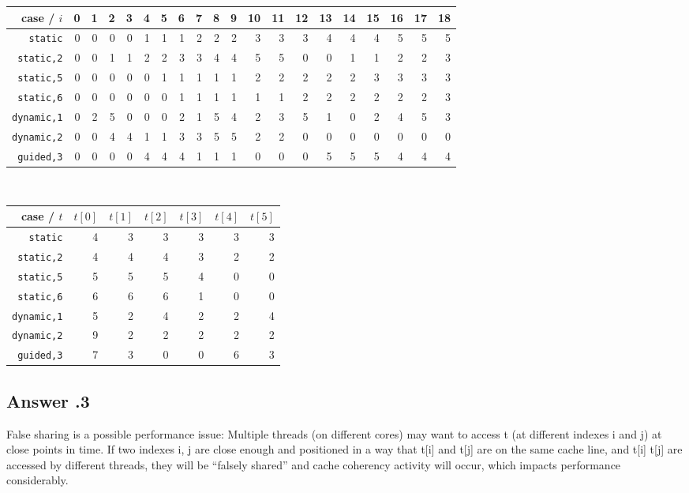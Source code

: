 \documentclass[a4paper,%
11pt,%
DIV=12,
headsepline,%
headings=normal,
]{scrartcl}
\newcounter{curex}
\newcommand{\answer}[1]{\subsection*{Answer \arabic{curex}.#1}}
\begin{document}
\begin{tabular}{rrrrrrrrrrrrrrrrrrrr}
  \toprule
 case /  $i$ & 0 & 1 & 2 & 3 & 4 & 5 & 6 & 7 & 8 & 9 & 10 & 11 & 12 & 13 & 14 & 15 & 16 & 17 & 18  \\
  \midrule
\texttt{static}     & 0 & 0 & 0 & 0 & 1 & 1 & 1 & 2 & 2 & 2 & 3 & 3 & 3 & 4 & 4 & 4 & 5 & 5 & 5 \\
\texttt{static,2}   & 0 & 0 & 1 & 1 & 2 & 2 & 3 & 3 & 4 & 4 & 5 & 5 & 0 & 0 & 1 & 1 & 2 & 2 & 3 \\
\texttt{static,5}   & 0 & 0 & 0 & 0 & 0 & 1 & 1 & 1 & 1 & 1 & 2 & 2 & 2 & 2 & 2 & 3 & 3 & 3 & 3 \\
\texttt{static,6}   & 0 & 0 & 0 & 0 & 0 & 0 & 1 & 1 & 1 & 1 & 1 & 1 & 2 & 2 & 2 & 2 & 2 & 2 & 3 \\ 
\texttt{dynamic,1}  & 0 & 2 & 5 & 0 & 0 & 0 & 2 & 1 & 5 & 4 & 2 & 3 & 5 & 1 & 0 & 2 & 4 & 5 & 3 \\
\texttt{dynamic,2}  & 0 & 0 & 4 & 4 & 1 & 1 & 3 & 3 & 5 & 5 & 2 & 2 & 0 & 0 & 0 & 0 & 0 & 0 & 0 \\
  \texttt{guided,3} & 0 & 0 & 0 & 0 & 4 & 4 & 4 & 1 & 1 & 1 & 0 & 0 & 0 & 5 & 5 & 5 & 4 & 4 & 4 \\
  \bottomrule
\end{tabular}\\

\begin{tabular}{rrrrrrr}
  \toprule
case / $t$             & $t[0]$ & $t[1]$ & $t[2]$ & $t[3]$ & $t[4]$ & $t[5]$ \\  
  \midrule
\texttt{static}    & 4 & 3 & 3 & 3 & 3 & 3 \\
\texttt{static,2}  & 4 & 4 & 4 & 3 & 2 & 2 \\
\texttt{static,5}  & 5 & 5 & 5 & 4 & 0 & 0 \\
\texttt{static,6}  & 6 & 6 & 6 & 1 & 0 & 0 \\
\texttt{dynamic,1} & 5 & 2 & 4 & 2 & 2 & 4 \\
\texttt{dynamic,2} & 9 & 2 & 2 & 2 & 2 & 2 \\
\texttt{guided,3}  & 7 & 3 & 0 & 0 & 6 & 3 \\
    \bottomrule
\end{tabular}

\answer{3}
False sharing is a possible performance issue:
Multiple threads (on different cores) may want to access t (at different indexes i and j) at close points in time. If two indexes i, j are close enough and positioned in a way that t[i] and t[j] are on the same cache line, and t[i] t[j] are accessed by different threads, they will be ``falsely shared'' and cache coherency activity will occur, which impacts performance considerably. 
\end{document}

